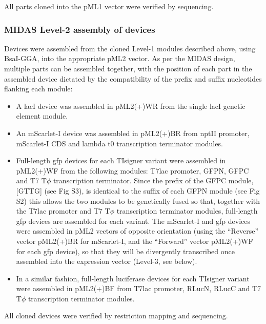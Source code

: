 All parts cloned into the pML1 vector were verified by sequencing.


\subsubsection{MIDAS Level-2 assembly of devices}
Devices were assembled from the cloned Level-1 modules described above, using BsaI-GGA, into the appropriate pML2 vector. As per the MIDAS design, multiple parts can be assembled together, with the position of each part in the assembled device dictated by the compatibility of the prefix and suffix nucleotides flanking each module:
\begin{itemize}
\item A lacI device was assembled in pML2(+)WR from the single lacI genetic element module.
\item An mScarlet-I device was assembled in pML2(+)BR from nptII promoter, mScarlet-I CDS and lambda t0 transcription terminator modules.
\item Full-length gfp devices for each TIsigner variant were assembled in pML2(+)WF from the following modules: T7lac promoter, GFPN, GFPC and T7 T$\phi$ transcription terminator. Since the prefix of the GFPC module, [GTTG] (see Fig S3), is identical to the suffix of each GFPN module (see Fig S2) this allows the two modules to be genetically fused so that, together with the T7lac promoter and T7 T$\phi$ transcription terminator modules, full-length gfp devices are assembled for each variant. The mScarlet-I and gfp devices were assembled in pML2 vectors of opposite orientation (using the “Reverse” vector pML2(+)BR for mScarlet-I, and the “Forward” vector pML2(+)WF for each gfp device), so that they will be divergently transcribed once assembled into the expression vector (Level-3, see below).
\item In a similar fashion, full-length luciferase devices for each TIsigner variant were assembled in pML2(+)BF from T7lac promoter, RLucN, RLucC and T7 T$\phi$ transcription terminator modules.
\end{itemize}
All cloned devices were verified by restriction mapping and sequencing.


